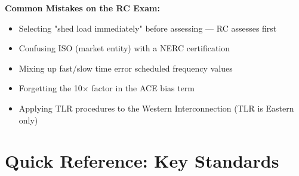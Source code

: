 \documentclass[12pt,twoside,openright]{memoir}
\begin{document}
\begin{warningbox}
\textbf{Common Mistakes on the RC Exam:}
\begin{itemize}
  \item Selecting "shed load immediately" before assessing — RC assesses first
  \item Confusing ISO (market entity) with a NERC certification
  \item Mixing up fast/slow time error scheduled frequency values
  \item Forgetting the 10$\times$ factor in the ACE bias term
  \item Applying TLR procedures to the Western Interconnection (TLR is Eastern only)
\end{itemize}
\end{warningbox}

\backmatter

\chapter*{Quick Reference: Key Standards}
\end{document}
